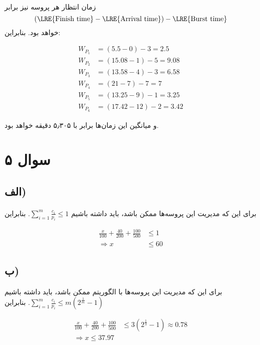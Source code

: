 \documentclass{article}
\begin{document}
	\paragraph*{}
	زمان انتظار هر پروسه نیز برابر
	\begin{equation*}
		(\textrm{\LRE{Finish time}} - \textrm{\LRE{Arrival time}}) - \textrm{\LRE{Burst time}}
	\end{equation*}
	خواهد بود. بنابراین:

	\begin{align*}
		W_{P_1} &= (5.5 - 0) - 3 = 2.5 \\
		W_{P_2} &= (15.08 - 1) - 5 = 9.08 \\
		W_{P_3} &= (13.58 - 4) - 3 = 6.58 \\
		W_{P_4} &= (21 - 7) - 7 = 7 \\
		W_{P_5} &= (13.25 - 9) - 1 = 3.25 \\
		W_{P_6} &= (17.42 - 12) - 2 = 3.42
	\end{align*}

	و میانگین این زمان‌ها برابر با
	۵٫۳۰۵
	دقیقه خواهد بود.

	\section*{سوال ۵}
	\subsection*{الف)}
	\paragraph*{}
	برای این که مدیریت این پروسه‌ها ممکن باشد، باید داشته باشیم
	$\sum_{i=1}^{m} \frac{c_i}{p_i} \le 1$.
	بنابراین

	\begin{align*}
		\frac{x}{100} + \frac{40}{200} + \frac{100}{500} &\le 1 \\
		\Rightarrow
		x &\le 60
	\end{align*}

	\subsection*{ب)}
	برای این که مدیریت این پروسه‌ها با الگوریتم
	ممکن باشد، باید داشته باشیم
	$\sum_{i=1}^{m} \frac{c_i}{p_i} \le m(2^{\frac{1}{m}} - 1)$.
	بنابراین

	\begin{align*}
		\frac{x}{100} + \frac{40}{200} + \frac{100}{500} &\le 3(2^{\frac{1}{3}} - 1) \approx 0.78 \\
		\Rightarrow
		x \le 37.97
	\end{align*}
\end{document}
